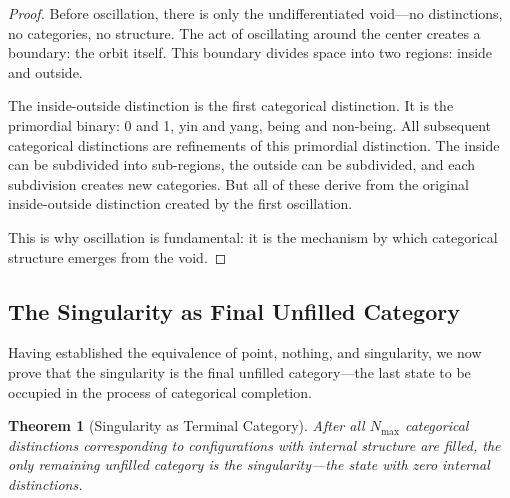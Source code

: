 \documentclass[12pt,a4paper]{article}
\newtheorem{theorem}{Theorem}[section]
\theoremstyle{definition}
\theoremstyle{remark}
\newcommand{\Nmax}{N_{\text{max}}}
\begin{document}
\begin{proof}
Before oscillation, there is only the undifferentiated void—no distinctions, no categories, no structure. The act of oscillating around the center creates a boundary: the orbit itself. This boundary divides space into two regions: inside and outside.

The inside-outside distinction is the first categorical distinction. It is the primordial binary: 0 and 1, yin and yang, being and non-being. All subsequent categorical distinctions are refinements of this primordial distinction. The inside can be subdivided into sub-regions, the outside can be subdivided, and each subdivision creates new categories. But all of these derive from the original inside-outside distinction created by the first oscillation.

This is why oscillation is fundamental: it is the mechanism by which categorical structure emerges from the void.
\end{proof}

\subsection{The Singularity as Final Unfilled Category}

Having established the equivalence of point, nothing, and singularity, we now prove that the singularity is the final unfilled category—the last state to be occupied in the process of categorical completion.

\begin{theorem}[Singularity as Terminal Category]
\label{thm:singularity_terminal}
After all $\Nmax$ categorical distinctions corresponding to configurations with internal structure are filled, the only remaining unfilled category is the singularity—the state with zero internal distinctions.
\end{theorem}
\end{document}
